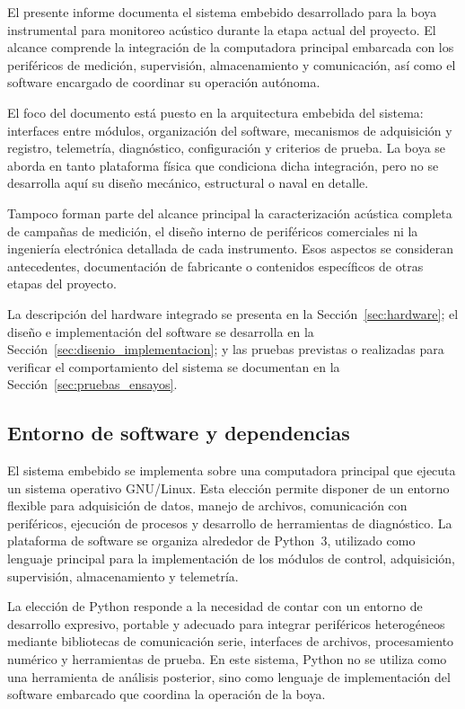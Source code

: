 El presente informe documenta el sistema embebido desarrollado para la boya instrumental para monitoreo acústico durante la etapa actual del proyecto. El alcance comprende la integración de la computadora principal embarcada con los periféricos de medición, supervisión, almacenamiento y comunicación, así como el software encargado de coordinar su operación autónoma.

El foco del documento está puesto en la arquitectura embebida del sistema: interfaces entre módulos, organización del software, mecanismos de adquisición y registro, telemetría, diagnóstico, configuración y criterios de prueba. La boya se aborda en tanto plataforma física que condiciona dicha integración, pero no se desarrolla aquí su diseño mecánico, estructural o naval en detalle.

Tampoco forman parte del alcance principal la caracterización acústica completa de campañas de medición, el diseño interno de periféricos comerciales ni la ingeniería electrónica detallada de cada instrumento. Esos aspectos se consideran antecedentes, documentación de fabricante o contenidos específicos de otras etapas del proyecto.

La descripción del hardware integrado se presenta en la Sección~\ref{sec:hardware}; el diseño e implementación del software se desarrolla en la Sección~\ref{sec:disenio_implementacion}; y las pruebas previstas o realizadas para verificar el comportamiento del sistema se documentan en la Sección~\ref{sec:pruebas_ensayos}.

\subsection{Entorno de software y dependencias}
\label{subsec:entorno_software}

El sistema embebido se implementa sobre una computadora principal que ejecuta un sistema operativo GNU/Linux. Esta elección permite disponer de un entorno flexible para adquisición de datos, manejo de archivos, comunicación con periféricos, ejecución de procesos y desarrollo de herramientas de diagnóstico. La plataforma de software se organiza alrededor de Python~3, utilizado como lenguaje principal para la implementación de los módulos de control, adquisición, supervisión, almacenamiento y telemetría.

La elección de Python responde a la necesidad de contar con un entorno de desarrollo expresivo, portable y adecuado para integrar periféricos heterogéneos mediante bibliotecas de comunicación serie, interfaces de archivos, procesamiento numérico y herramientas de prueba. En este sistema, Python no se utiliza como una herramienta de análisis posterior, sino como lenguaje de implementación del software embarcado que coordina la operación de la boya.


